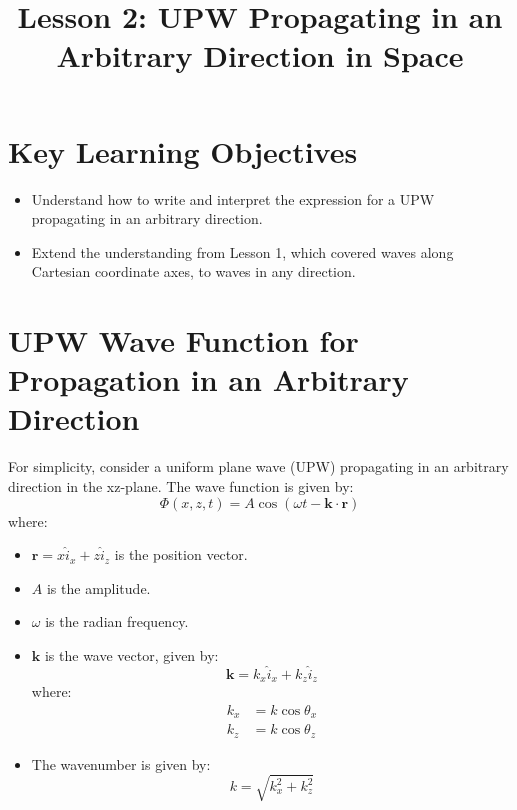 \documentclass{article}
\title{Lesson 2: UPW Propagating in an Arbitrary Direction in Space}
\author{}
\date{}
\begin{document}
\maketitle

\section{Key Learning Objectives}
\begin{itemize}
    \item Understand how to write and interpret the expression for a UPW propagating in an arbitrary direction.
    \item Extend the understanding from Lesson 1, which covered waves along Cartesian coordinate axes, to waves in any direction.
\end{itemize}

\section{UPW Wave Function for Propagation in an Arbitrary Direction}
For simplicity, consider a uniform plane wave (UPW) propagating in an arbitrary direction in the xz-plane. The wave function is given by:
\begin{equation}
    \Phi(x,z,t) = A \cos(\omega t - \mathbf{k} \cdot \mathbf{r})
\end{equation}
where:
\begin{itemize}
    \item $\mathbf{r} = x \hat{i}_x + z \hat{i}_z$ is the position vector.
    \item $A$ is the amplitude.
    \item $\omega$ is the radian frequency.
    \item $\mathbf{k}$ is the wave vector, given by:
    \begin{equation}
        \mathbf{k} = k_x \hat{i}_x + k_z \hat{i}_z
    \end{equation}
    where:
    \begin{align}
        k_x &= k \cos \theta_x \\
        k_z &= k \cos \theta_z
    \end{align}
    \item The wavenumber is given by:
    \begin{equation}
        k = \sqrt{k_x^2 + k_z^2}
    \end{equation}
\end{itemize}
\end{document}
